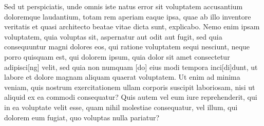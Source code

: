 \documentclass[a4paper,11pt]{article}
\begin{document}
Sed ut perspiciatis, unde omnis iste natus error sit voluptatem accusantium doloremque laudantium, totam rem aperiam eaque ipsa, quae ab illo inventore veritatis et quasi architecto beatae vitae dicta sunt, explicabo. Nemo enim ipsam voluptatem, quia voluptas sit, aspernatur aut odit aut fugit, sed quia consequuntur magni dolores eos, qui ratione voluptatem sequi nesciunt, neque porro quisquam est, qui dolorem ipsum, quia dolor sit amet consectetur adipisci[ng] velit, sed quia non numquam [do] eius modi tempora inci[di]dunt, ut labore et dolore magnam aliquam quaerat voluptatem. Ut enim ad minima veniam, quis nostrum exercitationem ullam corporis suscipit laboriosam, nisi ut aliquid ex ea commodi consequatur? Quis autem vel eum iure reprehenderit, qui in ea voluptate velit esse, quam nihil molestiae consequatur, vel illum, qui dolorem eum fugiat, quo voluptas nulla pariatur?





\end{document}
